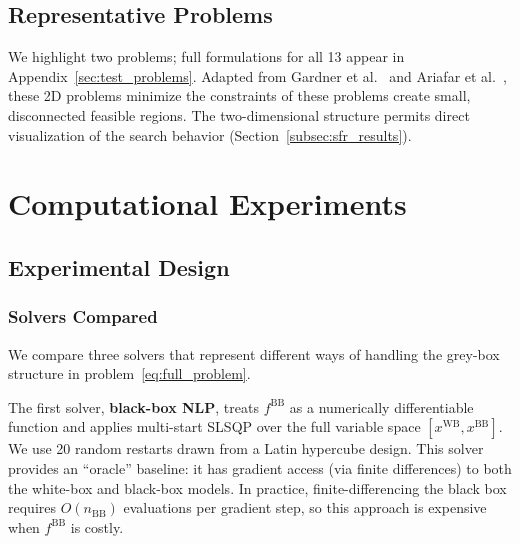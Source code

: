 \documentclass[12pt,a4paper]{article}%
\theoremstyle{plain}%
\theoremstyle{remark}%
\theoremstyle{definition}%
\def\WB{\mathrm{WB}}
\def\BB{\mathrm{BB}}
\begin{document}
\subsection{Representative Problems}\label{subsec:representative_problems}

We highlight two problems; full formulations for all 13 appear in Appendix~\ref{sec:test_problems}.
Adapted from Gardner et al.~\cite{gardner2014} and Ariafar et al.~\cite{Ariafar2019}, these 2D problems minimize the constraints of these problems create small, disconnected feasible regions. The two-dimensional structure permits direct visualization of the search behavior (Section~\ref{subsec:sfr_results}).


\section{Computational Experiments}\label{sec:experiments}\label{sec:results}

\subsection{Experimental Design}\label{sec:experimental_setup}

\subsubsection{Solvers Compared}\label{subsec:solvers_compared}

We compare three solvers that represent different ways of handling the grey-box structure in problem~\eqref{eq:full_problem}.

The first solver, \textbf{black-box NLP}, treats $f^{\BB}$ as a numerically differentiable function and applies multi-start SLSQP over the full variable space $[x^{\WB}, x^{\BB}]$. We use 20 random restarts drawn from a Latin hypercube design. This solver provides an ``oracle'' baseline: it has gradient access (via finite differences) to both the white-box and black-box models. In practice, finite-differencing the black box requires $O(n_{\BB})$ evaluations per gradient step, so this approach is expensive when $f^{\BB}$ is costly.
\end{document}

